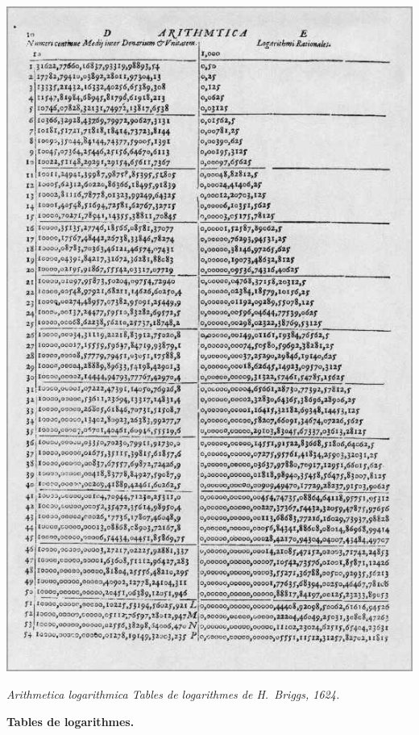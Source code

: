 \documentclass[11pt,class=report,crop=false]{standalone}
\begin{document}
\begin{cours}
\begin{center}
\includegraphics[scale=\myscale,scale=0.25]{briggs_2}

\emph{\og{}Arithmetica logarithmica\fg{} Tables de logarithmes de H.~Briggs, 1624.}
\end{center}


\textbf{Tables de logarithmes.}


\end{cours}
\end{document}
